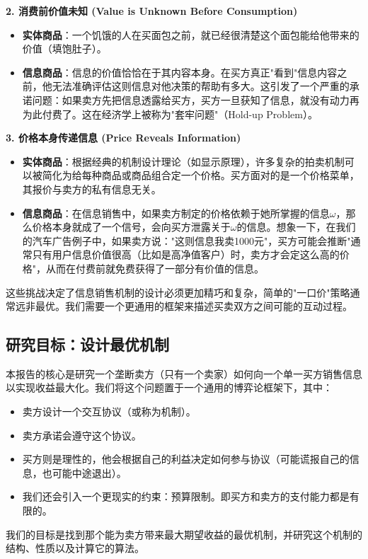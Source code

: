 \textbf{2. 消费前价值未知 (Value is Unknown Before Consumption)}
\begin{itemize}
   \item \textbf{实体商品}：一个饥饿的人在买面包之前，就已经很清楚这个面包能给他带来的价值（填饱肚子）。
   \item \textbf{信息商品}：信息的价值恰恰在于其内容本身。在买方真正"看到"信息内容之前，他无法准确评估这则信息对他决策的帮助有多大。这引发了一个严重的承诺问题：如果卖方先把信息透露给买方，买方一旦获知了信息，就没有动力再为此付费了。这在经济学上被称为"套牢问题"（Hold-up Problem）。
\end{itemize}

\textbf{3. 价格本身传递信息 (Price Reveals Information)}
\begin{itemize}
   \item \textbf{实体商品}：根据经典的机制设计理论（如显示原理），许多复杂的拍卖机制可以被简化为给每种商品或商品组合定一个价格。买方面对的是一个价格菜单，其报价与卖方的私有信息无关。
   \item \textbf{信息商品}：在信息销售中，如果卖方制定的价格依赖于她所掌握的信息$\omega$，那么价格本身就成了一个信号，会向买方泄露关于$\omega$的信息。想象一下，在我们的汽车广告例子中，如果卖方说："这则信息我卖1000元"，买方可能会推断"通常只有用户信息价值很高（比如是高净值客户）时，卖方才会定这么高的价格"，从而在付费前就免费获得了一部分有价值的信息。
\end{itemize}

这些挑战决定了信息销售机制的设计必须更加精巧和复杂，简单的"一口价"策略通常远非最优。我们需要一个更通用的框架来描述买卖双方之间可能的互动过程。

\subsection{研究目标：设计最优机制}

本报告的核心是研究一个垄断卖方（只有一个卖家）如何向一个单一买方销售信息以实现收益最大化。我们将这个问题置于一个通用的博弈论框架下，其中：
\begin{itemize}
   \item 卖方设计一个交互协议（或称为机制）。
   \item 卖方承诺会遵守这个协议。
   \item 买方则是理性的，他会根据自己的利益决定如何参与协议（可能谎报自己的信息，也可能中途退出）。
   \item 我们还会引入一个更现实的约束：预算限制。即买方和卖方的支付能力都是有限的。
\end{itemize}

我们的目标是找到那个能为卖方带来最大期望收益的最优机制，并研究这个机制的结构、性质以及计算它的算法。
